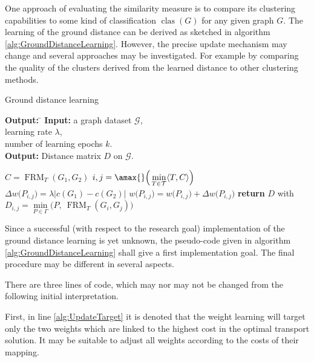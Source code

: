 One approach of evaluating the similarity measure is to compare its clustering capabilities to some kind of classification $\operatorname{clas}(G)$ for any given graph $G$. 
The learning of the ground distance can be derived as sketched in algorithm \ref{alg:GroundDistanceLearning}.
However, the precise update mechanism may change and several approaches may be investigated.
For example by comparing the quality of the clusters derived from the learned distance to other clustering methods.

\begin{algorithm}[H]
	\caption{Ground distance learning} \label{alg:GroundDistanceLearning} 
	\begin{tabbing}
		\textbf{Output:} \= \kill
		\textbf{Input:} \>a graph dataset $\mathcal{G}$,\\
		\>learning rate $\lambda$,\\
		\>number of learning epochs $k$.\\
		\textbf{Output:} \>Distance matrix $D$ on $\mathcal{G}$.
	\end{tabbing}	
	\begin{algorithmic}[1]				
				\State $C=\operatorname{FRM}_T(G_1, G_2)$ 
				\State $i,j = \amax{}\Big( \min\limits_{T\in\mathcal{T}} \langle T,C\rangle \Big)$  \label{alg:UpdateTarget}
				\State $\Delta w\big(P_{i,j}\big) = \lambda \big|c(G_1)-c(G_2)\big|$ \label{alg:Evaluation}
				\State $w\big(P_{i,j}\big) = w\big(P_{i,j}\big) + \Delta  w\big(P_{i,j}\big)$ \label{alg:DistUpdate}
			\EndFor
		\EndFor
		\State \textbf{return} $D$ with $D_{i,j} = \min\limits_{P\in\Gamma} \Big(P, \ \operatorname{FRM}_T(G_i, G_j) \Big)$ 
	\end{algorithmic}
\end{algorithm}

Since a successful (with respect to the research goal) implementation of the ground distance learning is yet unknown, the pseudo-code given in algorithm \ref{alg:GroundDistanceLearning} shall give a first implementation goal.
The final procedure may be different in several aspects.

There are three lines of code, which may nor may not be changed from the following initial interpretation.

First, in line \ref{alg:UpdateTarget} it is denoted that the weight learning will target only the two weights which are linked to the highest cost in the optimal transport solution.
It may be suitable to adjust all weights according to the costs of their mapping.

